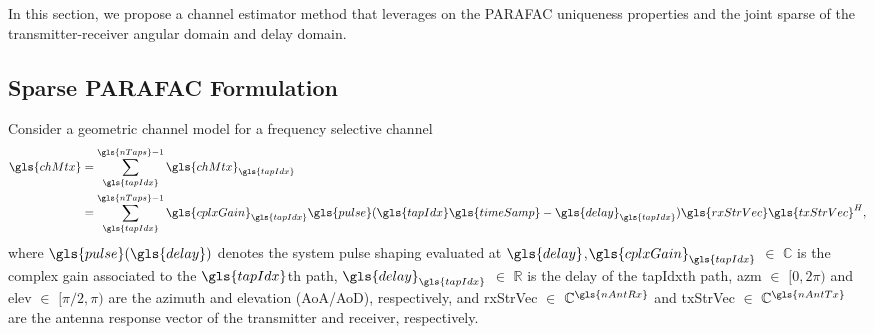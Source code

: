 \documentclass[conference]{IEEEtran}
\begin{document}
In this section, we propose a channel estimator method that leverages on the
\gls{PARAFAC} uniqueness properties and the joint sparse of the transmitter-receiver
angular domain and delay domain. 


\subsection{Sparse \gls{PARAFAC} Formulation}
\label{sec:parafac_model}

Consider a geometric  channel model for a frequency selective channel
\begin{align}
  \label{eq:tap_model}
  \gls{chMtx} & = \sum_{\gls{tapIdx}}^{\gls{nTaps}-1}  \gls{chMtx}_{\gls{tapIdx}} \nonumber \\
              & = \sum_{\gls{tapIdx}}^{\gls{nTaps}-1}\gls{cplxGain}_{\gls{tapIdx}}\gls{pulse}(\gls{tapIdx}\gls{timeSamp} - \gls{delay}_{\gls{tapIdx}})\gls{rxStrVec}\gls{txStrVec}^H,
\end{align}
where $\gls{pulse}(\gls{delay})$
denotes the system pulse shaping evaluated at
$\gls{delay}$,$\gls{cplxGain}_{\gls{tapIdx}}$ $\in$ $\mathbb{C}$ is the complex
gain associated to the $\gls{tapIdx}$th path, $\gls{delay}_{\gls{tapIdx}}$ $\in$
$\mathbb{R}$ is the delay of the \gls{tapIdx}th path, \gls{azm} $\in$ $[0,2\pi)$
and \gls{elev} $\in$ $[\pi/2, \pi)$ are the azimuth and elevation (AoA/AoD),
respectively, and \gls{rxStrVec} $\in$ $\mathbb{C}^{\gls{nAntRx}}$ and
\gls{txStrVec} $\in$ $\mathbb{C}^{\gls{nAntTx}}$ are the antenna response vector
of the transmitter and receiver, respectively.
\end{document}
